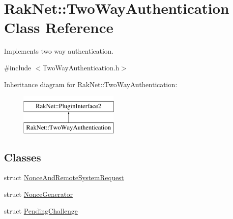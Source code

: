 \hypertarget{class_rak_net_1_1_two_way_authentication}{\section{Rak\-Net\-:\-:Two\-Way\-Authentication Class Reference}
\label{class_rak_net_1_1_two_way_authentication}
}


Implements two way authentication.  




{\ttfamily \#include $<$Two\-Way\-Authentication.\-h$>$}

Inheritance diagram for Rak\-Net\-:\-:Two\-Way\-Authentication\-:\begin{figure}[H]
\begin{center}
\leavevmode
\includegraphics[height=2.000000cm]{class_rak_net_1_1_two_way_authentication}
\end{center}
\end{figure}
\subsection*{Classes}
\begin{DoxyCompactItemize}
\item 
struct \hyperlink{struct_rak_net_1_1_two_way_authentication_1_1_nonce_and_remote_system_request}{Nonce\-And\-Remote\-System\-Request}
\item 
struct \hyperlink{struct_rak_net_1_1_two_way_authentication_1_1_nonce_generator}{Nonce\-Generator}
\item 
struct \hyperlink{struct_rak_net_1_1_two_way_authentication_1_1_pending_challenge}{Pending\-Challenge}
\end{DoxyCompactItemize}

